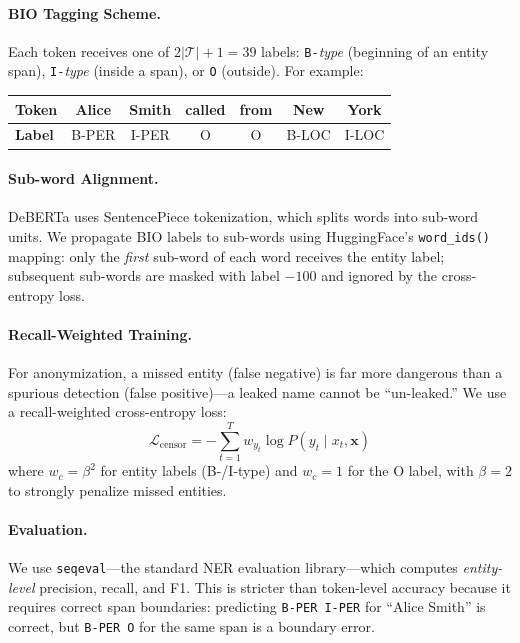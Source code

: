 \documentclass[11pt, a4paper]{article}
\begin{document}
\paragraph{BIO Tagging Scheme.}
Each token receives one of $2|\mathcal{T}| + 1 = 39$ labels:
\texttt{B-}\emph{type} (beginning of an entity span),
\texttt{I-}\emph{type} (inside a span), or \texttt{O} (outside).
For example:

\begin{center}
\small
\begin{tabular}{lcccccc}
\toprule
\textbf{Token} & Alice & Smith & called & from & New & York \\
\midrule
\textbf{Label} & B-PER & I-PER & O & O & B-LOC & I-LOC \\
\bottomrule
\end{tabular}
\end{center}

\paragraph{Sub-word Alignment.}
DeBERTa uses SentencePiece tokenization, which splits words into
sub-word units.  We propagate BIO labels to sub-words using
HuggingFace's \texttt{word\_ids()} mapping: only the \emph{first}
sub-word of each word receives the entity label; subsequent sub-words
are masked with label $-100$ and ignored by the cross-entropy loss.

\paragraph{Recall-Weighted Training.}
For anonymization, a missed entity (false negative) is far more
dangerous than a spurious detection (false positive)---a leaked name
cannot be ``un-leaked.''  We use a recall-weighted cross-entropy loss:
\begin{equation}
  \mathcal{L}_{\text{censor}} = -\sum_{t=1}^{T} w_{y_t} \log P(y_t \mid x_t, \mathbf{x})
  \label{eq:censor_loss}
\end{equation}
where $w_c = \beta^2$ for entity labels (B-/I-type) and $w_c = 1$ for
the O label, with $\beta = 2$ to strongly penalize missed entities.

\paragraph{Evaluation.}
We use \texttt{seqeval}---the standard NER evaluation library---which
computes \emph{entity-level} precision, recall, and F1.  This is
stricter than token-level accuracy because it requires correct span
boundaries: predicting \texttt{B-PER I-PER} for ``Alice Smith'' is
correct, but \texttt{B-PER O} for the same span is a boundary error.
\end{document}
